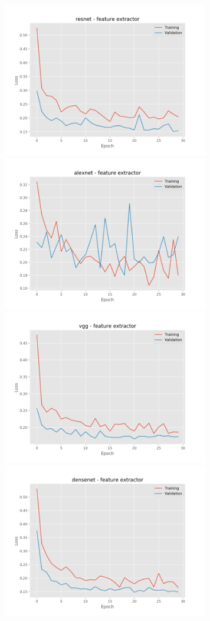 \documentclass[]{kththesis}
\begin{document}
\printbibliography[heading=bibintoc]
\appendix
  \begin{figure}[h]
    \includegraphics[width=9cm]{b_l_resnet_fe}
    \includegraphics[width=9cm]{b_l_alexnet_fe}
    \includegraphics[width=9cm]{b_l_vgg_fe}
    \includegraphics[width=9cm]{b_l_densenet_fe}

\end{figure}
\end{document}
